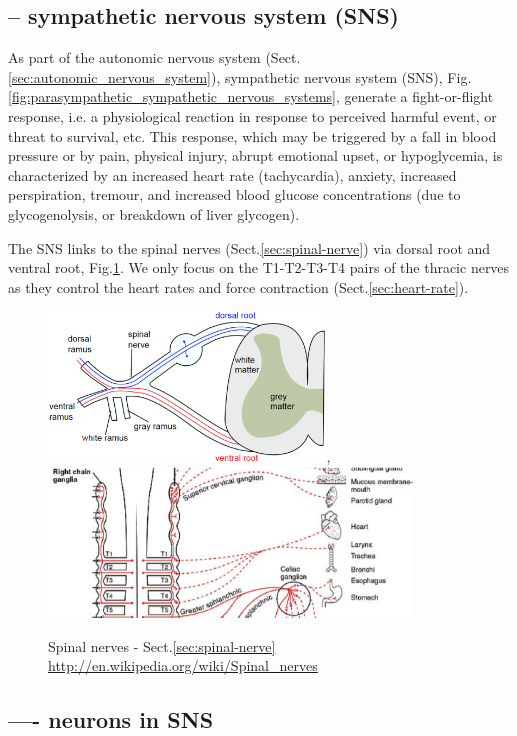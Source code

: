 \subsection{-- sympathetic nervous system (SNS)}
\label{sec:sympathetic_nervous system}

As part of the autonomic nervous system
(Sect.\ref{sec:autonomic_nervous_system}), sympathetic nervous system (SNS),
Fig.\ref{fig:parasympathetic_sympathetic_nervous_systems}, generate a
fight-or-flight response, i.e. a physiological reaction in response to perceived
harmful event, or threat to survival, etc.
This response, which may be triggered by a fall in blood pressure or by pain,
physical injury, abrupt emotional upset, or hypoglycemia, is characterized by an
increased heart rate (tachycardia), anxiety, increased perspiration, tremour,
and increased blood glucose concentrations (due to glycogenolysis, or breakdown
of liver glycogen).


The SNS links to the spinal nerves (Sect.\ref{sec:spinal-nerve}) via dorsal root
and ventral root, Fig.\ref{fig:spinal_nerves}. We only focus on the T1-T2-T3-T4
pairs of the thracic nerves as they control the heart rates and force
contraction (Sect.\ref{sec:heart-rate}). 

\begin{figure}[hbt]
  \centerline{\includegraphics[height=4cm,
    angle=0]{./images/spinal_nerves.eps}, 
    \includegraphics[height=4cm,
    angle=0]{./images/thoracic_nerves_heart.eps}}
  \caption{Spinal nerves -
  Sect.\ref{sec:spinal-nerve} \url{http://en.wikipedia.org/wiki/Spinal_nerves}}
  \label{fig:spinal_nerves}
\end{figure}


\subsection{---- neurons in SNS}

